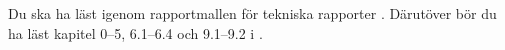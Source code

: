 Du ska ha läst igenom rapportmallen för tekniska rapporter 
\citep{Bosk2012etr,MiUn2012rft}.
Därutöver bör du ha läst kapitel 0--5, 6.1--6.4 och 9.1--9.2 
i  \citep{Brookshear2012csa}.
